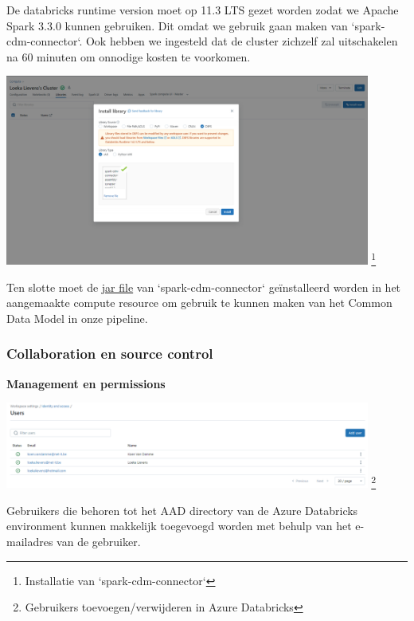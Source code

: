 De databricks runtime version moet op 11.3 LTS gezet worden zodat we Apache Spark 3.3.0 kunnen gebruiken. Dit omdat we gebruik gaan maken van `spark-cdm-connector`. Ook hebben we ingesteld dat de cluster zichzelf zal uitschakelen na 60 minuten om onnodige kosten te voorkomen.

\begin{center}
    \includegraphics[width=0.9\textwidth]{./graphics/databricks/initial_6.png}
    \footnote{Installatie van `spark-cdm-connector`}
\end{center}

Ten slotte moet de \href{https://github.com/Azure/spark-cdm-connector/releases/tag/spark3.3-1.19.5}{jar file} van `spark-cdm-connector` geïnstalleerd worden in het aangemaakte compute resource om gebruik te kunnen maken van het Common Data Model in onze pipeline.

\subsubsection{Collaboration en source control}

\textbf{Management en permissions}

\begin{center}
    \includegraphics[width=0.9\textwidth]{./graphics/databricks/management_permissions_1.png}
    \footnote{Gebruikers toevoegen/verwijderen in Azure Databricks}
\end{center}

Gebruikers die behoren tot het AAD directory van de Azure Databricks environment kunnen makkelijk toegevoegd worden met behulp van het e-mailadres van de gebruiker.

